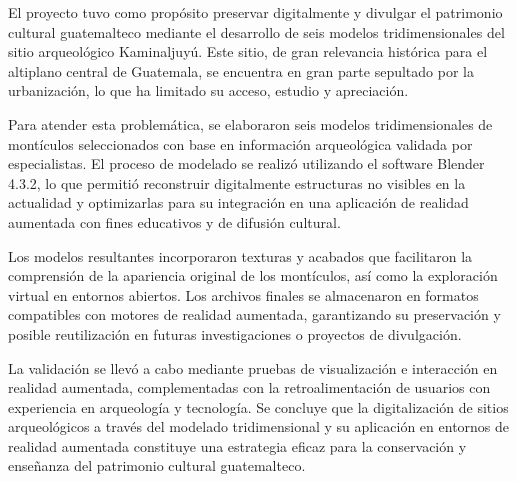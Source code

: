 
El proyecto tuvo como propósito preservar digitalmente y divulgar el patrimonio cultural guatemalteco mediante el desarrollo de seis modelos tridimensionales del sitio arqueológico Kaminaljuyú. Este sitio, de gran relevancia histórica para el altiplano central de Guatemala, se encuentra en gran parte sepultado por la urbanización, lo que ha limitado su acceso, estudio y apreciación.

Para atender esta problemática, se elaboraron seis modelos tridimensionales de montículos seleccionados con base en información arqueológica validada por especialistas. El proceso de modelado se realizó utilizando el software Blender 4.3.2, lo que permitió reconstruir digitalmente estructuras no visibles en la actualidad y optimizarlas para su integración en una aplicación de realidad aumentada con fines educativos y de difusión cultural.

Los modelos resultantes incorporaron texturas y acabados que facilitaron la comprensión de la apariencia original de los montículos, así como la exploración virtual en entornos abiertos. Los archivos finales se almacenaron en formatos compatibles con motores de realidad aumentada, garantizando su preservación y posible reutilización en futuras investigaciones o proyectos de divulgación.

La validación se llevó a cabo mediante pruebas de visualización e interacción en realidad aumentada, complementadas con la retroalimentación de usuarios con experiencia en arqueología y tecnología. Se concluye que la digitalización de sitios arqueológicos a través del modelado tridimensional y su aplicación en entornos de realidad aumentada constituye una estrategia eficaz para la conservación y enseñanza del patrimonio cultural guatemalteco.